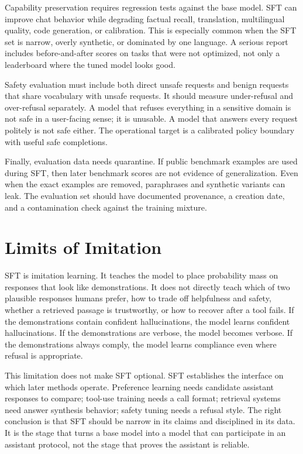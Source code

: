 Capability preservation requires regression tests against the base model. SFT can improve chat behavior while degrading factual recall, translation, multilingual quality, code generation, or calibration. This is especially common when the SFT set is narrow, overly synthetic, or dominated by one language. A serious report includes before-and-after scores on tasks that were not optimized, not only a leaderboard where the tuned model looks good.

Safety evaluation must include both direct unsafe requests and benign requests that share vocabulary with unsafe requests. It should measure under-refusal and over-refusal separately. A model that refuses everything in a sensitive domain is not safe in a user-facing sense; it is unusable. A model that answers every request politely is not safe either. The operational target is a calibrated policy boundary with useful safe completions.

Finally, evaluation data needs quarantine. If public benchmark examples are used during SFT, then later benchmark scores are not evidence of generalization. Even when the exact examples are removed, paraphrases and synthetic variants can leak. The evaluation set should have documented provenance, a creation date, and a contamination check against the training mixture.

\section{Limits of Imitation}
\label{sec:sft-limits}

SFT is imitation learning. It teaches the model to place probability mass on responses that look like demonstrations. It does not directly teach which of two plausible responses humans prefer, how to trade off helpfulness and safety, whether a retrieved passage is trustworthy, or how to recover after a tool fails. If the demonstrations contain confident hallucinations, the model learns confident hallucinations. If the demonstrations are verbose, the model becomes verbose. If the demonstrations always comply, the model learns compliance even where refusal is appropriate.

This limitation does not make SFT optional. SFT establishes the interface on which later methods operate. Preference learning needs candidate assistant responses to compare; tool-use training needs a call format; retrieval systems need answer synthesis behavior; safety tuning needs a refusal style. The right conclusion is that SFT should be narrow in its claims and disciplined in its data. It is the stage that turns a base model into a model that can participate in an assistant protocol, not the stage that proves the assistant is reliable.

